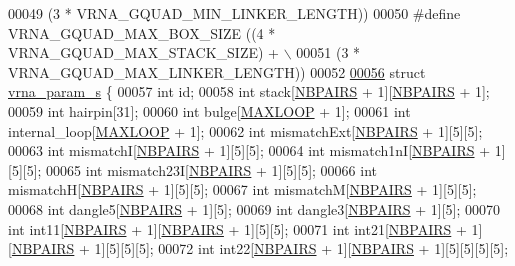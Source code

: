 \begin{DoxyCode}
00049 \textcolor{preprocessor}{                                         (3 * VRNA\_GQUAD\_MIN\_LINKER\_LENGTH))}
00050 \textcolor{preprocessor}{#define   VRNA\_GQUAD\_MAX\_BOX\_SIZE       ((4 * VRNA\_GQUAD\_MAX\_STACK\_SIZE) + \(\backslash\)}
00051 \textcolor{preprocessor}{                                         (3 * VRNA\_GQUAD\_MAX\_LINKER\_LENGTH))}
00052 
\hyperlink{group__energy__parameters}{00056} \textcolor{keyword}{struct }\hyperlink{group__energy__parameters_structvrna__param__s}{vrna\_param\_s} \{
00057   \textcolor{keywordtype}{int}       id;
00058   \textcolor{keywordtype}{int}       stack[\hyperlink{constants_8h_a5e75221c779d618eab81e096f37e32ce}{NBPAIRS} + 1][\hyperlink{constants_8h_a5e75221c779d618eab81e096f37e32ce}{NBPAIRS} + 1];
00059   \textcolor{keywordtype}{int}       hairpin[31];
00060   \textcolor{keywordtype}{int}       bulge[\hyperlink{constants_8h_ad1bd6eabac419670ddd3c9ed82145988}{MAXLOOP} + 1];
00061   \textcolor{keywordtype}{int}       internal\_loop[\hyperlink{constants_8h_ad1bd6eabac419670ddd3c9ed82145988}{MAXLOOP} + 1];
00062   \textcolor{keywordtype}{int}       mismatchExt[\hyperlink{constants_8h_a5e75221c779d618eab81e096f37e32ce}{NBPAIRS} + 1][5][5];
00063   \textcolor{keywordtype}{int}       mismatchI[\hyperlink{constants_8h_a5e75221c779d618eab81e096f37e32ce}{NBPAIRS} + 1][5][5];
00064   \textcolor{keywordtype}{int}       mismatch1nI[\hyperlink{constants_8h_a5e75221c779d618eab81e096f37e32ce}{NBPAIRS} + 1][5][5];
00065   \textcolor{keywordtype}{int}       mismatch23I[\hyperlink{constants_8h_a5e75221c779d618eab81e096f37e32ce}{NBPAIRS} + 1][5][5];
00066   \textcolor{keywordtype}{int}       mismatchH[\hyperlink{constants_8h_a5e75221c779d618eab81e096f37e32ce}{NBPAIRS} + 1][5][5];
00067   \textcolor{keywordtype}{int}       mismatchM[\hyperlink{constants_8h_a5e75221c779d618eab81e096f37e32ce}{NBPAIRS} + 1][5][5];
00068   \textcolor{keywordtype}{int}       dangle5[\hyperlink{constants_8h_a5e75221c779d618eab81e096f37e32ce}{NBPAIRS} + 1][5];
00069   \textcolor{keywordtype}{int}       dangle3[\hyperlink{constants_8h_a5e75221c779d618eab81e096f37e32ce}{NBPAIRS} + 1][5];
00070   \textcolor{keywordtype}{int}       int11[\hyperlink{constants_8h_a5e75221c779d618eab81e096f37e32ce}{NBPAIRS} + 1][\hyperlink{constants_8h_a5e75221c779d618eab81e096f37e32ce}{NBPAIRS} + 1][5][5];
00071   \textcolor{keywordtype}{int}       int21[\hyperlink{constants_8h_a5e75221c779d618eab81e096f37e32ce}{NBPAIRS} + 1][\hyperlink{constants_8h_a5e75221c779d618eab81e096f37e32ce}{NBPAIRS} + 1][5][5][5];
00072   \textcolor{keywordtype}{int}       int22[\hyperlink{constants_8h_a5e75221c779d618eab81e096f37e32ce}{NBPAIRS} + 1][\hyperlink{constants_8h_a5e75221c779d618eab81e096f37e32ce}{NBPAIRS} + 1][5][5][5][5];

\end{DoxyCode}

